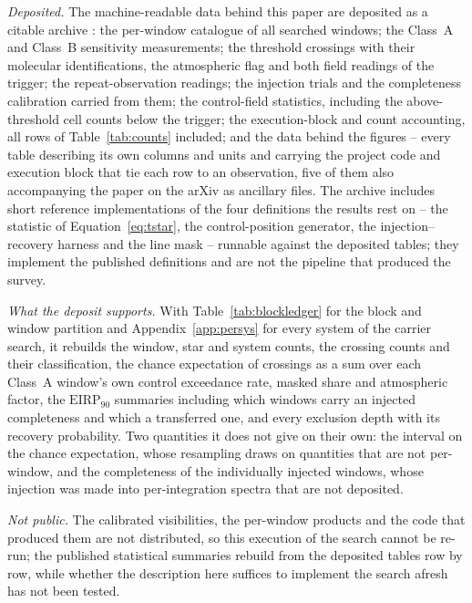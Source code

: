 \emph{Deposited.} The machine-readable data behind this paper are deposited as
a citable archive \citep{SIdeposit}: the per-window catalogue of all
\NWindows{} searched windows; the Class~A and Class~B sensitivity measurements;
the \EvNCrossRaw{} threshold crossings with their molecular identifications,
the atmospheric flag and both field readings of the trigger; the
repeat-observation readings; the injection trials and the completeness
calibration carried from them; the control-field statistics, including the
above-threshold cell counts below the trigger; the execution-block and count
accounting, all \MtCountRows{} rows of Table~\ref{tab:counts} included; and the
data behind the figures -- every table describing its own columns and units and
carrying the project code and execution block that tie each row to an
observation, five of them also accompanying the paper on the arXiv as ancillary
files. The archive includes short reference implementations of the four
definitions the results rest on -- the statistic of Equation~\ref{eq:tstar},
the control-position generator, the injection--recovery harness and the line
mask -- runnable against the deposited tables; they implement the published
definitions and are not the pipeline that produced the survey.

\emph{What the deposit supports.} With Table~\ref{tab:blockledger} for the
block and window partition and Appendix~\ref{app:persys} for every system of
the carrier search, it rebuilds the window, star and system counts, the
crossing counts and their classification, the chance expectation of \CeExp{}
crossings as a sum over each Class~A window's own control exceedance rate,
masked share and atmospheric factor, the $\mathrm{EIRP}_{90}$ summaries
including which windows carry an injected completeness and which a transferred
one, and every exclusion depth with its recovery probability. Two quantities it
does not give on their own: the interval on the chance expectation, whose
resampling draws on quantities that are not per-window, and the completeness of
the individually injected windows, whose injection was made into
per-integration spectra that are not deposited.

\emph{Not public.} The calibrated visibilities, the per-window products and the
code that produced them are not distributed, so this execution of the search
cannot be re-run; the published statistical summaries rebuild from the
deposited tables row by row, while whether the description here suffices to
implement the search afresh has not been tested.
